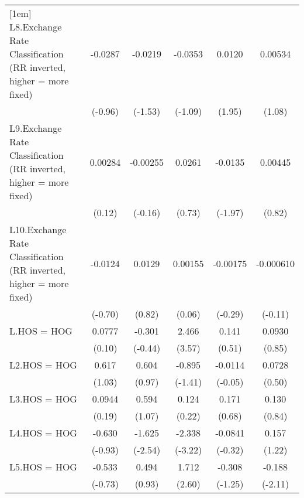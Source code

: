{\begin{longtable}{l*{5}{c}}
[1em]
L8.Exchange Rate Classification (RR inverted, higher = more fixed)&  -0.0287         &  -0.0219         &  -0.0353         &   0.0120         &  0.00534         \\
                &  (-0.96)         &  (-1.53)         &  (-1.09)         &   (1.95)         &   (1.08)         \\
[1em]
L9.Exchange Rate Classification (RR inverted, higher = more fixed)&  0.00284         & -0.00255         &   0.0261         &  -0.0135         &  0.00445         \\
                &   (0.12)         &  (-0.16)         &   (0.73)         &  (-1.97)         &   (0.82)         \\
[1em]
L10.Exchange Rate Classification (RR inverted, higher = more fixed)&  -0.0124         &   0.0129         &  0.00155         & -0.00175         &-0.000610         \\
                &  (-0.70)         &   (0.82)         &   (0.06)         &  (-0.29)         &  (-0.11)         \\
[1em]
L.HOS = HOG     &   0.0777         &   -0.301         &    2.466\sym{***}&    0.141         &   0.0930         \\
                &   (0.10)         &  (-0.44)         &   (3.57)         &   (0.51)         &   (0.85)         \\
[1em]
L2.HOS = HOG    &    0.617         &    0.604         &   -0.895         &  -0.0114         &   0.0728         \\
                &   (1.03)         &   (0.97)         &  (-1.41)         &  (-0.05)         &   (0.50)         \\
[1em]
L3.HOS = HOG    &   0.0944         &    0.594         &    0.124         &    0.171         &    0.130         \\
                &   (0.19)         &   (1.07)         &   (0.22)         &   (0.68)         &   (0.84)         \\
[1em]
L4.HOS = HOG    &   -0.630         &   -1.625\sym{*}  &   -2.338\sym{**} &  -0.0841         &    0.157         \\
                &  (-0.93)         &  (-2.54)         &  (-3.22)         &  (-0.32)         &   (1.22)         \\
[1em]
L5.HOS = HOG    &   -0.533         &    0.494         &    1.712\sym{*}  &   -0.308         &   -0.188\sym{*}  \\
                &  (-0.73)         &   (0.93)         &   (2.60)         &  (-1.25)         &  (-2.11)         \\

\end{longtable}}
